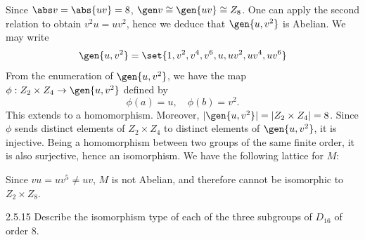 \begin{sol}[spsol]
    Since $\abs v = \abs{uv} = 8$, $\gen v \cong \gen{uv} \cong Z_8$.
	One can apply the second relation to obtain $v^2u = uv^2$, hence we deduce that $\gen{u, v^2}$ is Abelian.
	We may write
    \[
    	\gen{u, v^2} = \set{1, v^2, v^4, v^6, u, uv^2, uv^4, uv^6}
    \]
    From the enumeration of $\gen{u, v^2}$, we have the map $\phi : Z_2 \times Z_4 \to \gen{u, v^2}$ defined by
    \[
    	\phi(a) = u, \quad \phi(b) = v^2.
    \]
    This extends to a homomorphism.
	Moreover, $|\gen{u, v^2}| = |Z_2 \times Z_4| = 8$.
	Since $\phi$ sends distinct elements of $Z_2 \times Z_4$ to distinct elements of $\gen{u, v^2}$, it is injective.
	Being a homomorphism between two groups of the same finite order, it is also surjective, hence an isomorphism.
	We have the following lattice for $M$:
    \begin{center}
    \end{center}
    Since $vu = uv^5 \neq uv$, $M$ is not Abelian, and therefore cannot be isomorphic to $Z_2 \times Z_8$.
\end{sol}

\begin{exercise}{2.5.15}
    Describe the isomorphism type of each of the three subgroups of $D_{16}$ of order 8.
\end{exercise}

